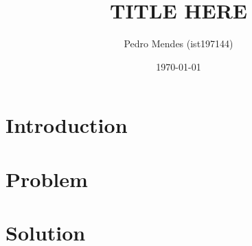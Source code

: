 \documentclass[a4paper]{article}
\begin{document}
\title{TITLE HERE} %
\author{Pedro Mendes (ist197144)}
\date{\today}
\maketitle

\section{Introduction}

\section{Problem}

\section{Solution}
\end{document}
